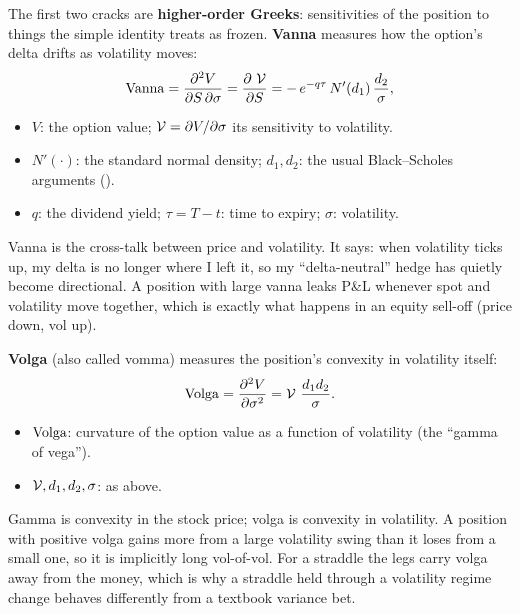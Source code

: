 The first two cracks are \textbf{higher-order Greeks}: sensitivities of the position to things the simple identity treats as frozen. \textbf{Vanna} measures how the option's delta drifts as volatility moves:
\begin{equation}
\label{eq:ivrv:vanna}
\operatorname{Vanna} = \frac{\partial^2 V}{\partial S\,\partial \sigma} = \frac{\partial\, \operatorname{\mathcal{V}}}{\partial S} = -\,e^{-q\tau}\,N'(d_1)\,\frac{d_2}{\sigma},
\end{equation}
\begin{itemize}
  \item $V$: the option value; $\operatorname{\mathcal{V}} = \partial V/\partial\sigma$ its sensitivity to volatility.
  \item $N'(\cdot)$: the standard normal density; $d_1, d_2$: the usual Black--Scholes arguments ().
  \item $q$: the dividend yield; $\tau = T-t$: time to expiry; $\sigma$: volatility.
\end{itemize}

\begin{intuition}
Vanna is the cross-talk between price and volatility. It says: when volatility ticks up, my delta is no longer where I left it, so my ``delta-neutral'' hedge has quietly become directional. A position with large vanna leaks P\&L whenever spot and volatility move together, which is exactly what happens in an equity sell-off (price down, vol up).
\end{intuition}

\textbf{Volga} (also called vomma) measures the position's convexity in volatility itself:
\begin{equation}
\label{eq:ivrv:volga}
\operatorname{Volga} = \frac{\partial^2 V}{\partial \sigma^2} = \operatorname{\mathcal{V}}\,\frac{d_1 d_2}{\sigma}.
\end{equation}
\begin{itemize}
  \item $\operatorname{Volga}$: curvature of the option value as a function of volatility (the ``gamma of vega'').
  \item $\operatorname{\mathcal{V}}, d_1, d_2, \sigma$: as above.
\end{itemize}

\begin{intuition}
Gamma is convexity in the stock price; volga is convexity in volatility. A position with positive volga gains more from a large volatility swing than it loses from a small one, so it is implicitly long vol-of-vol. For a straddle the legs carry volga away from the money, which is why a straddle held through a volatility regime change behaves differently from a textbook variance bet.
\end{intuition}

